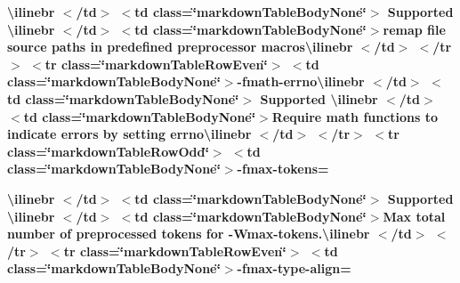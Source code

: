 \begin{longtabu}
{\bfseries{{\ttfamily \textbackslash{}ilinebr \texorpdfstring{$<$}{<}/td\texorpdfstring{$>$}{>} \texorpdfstring{$<$}{<}td class=\char`\"{}markdown\+Table\+Body\+None\char`\"{}\texorpdfstring{$>$}{>} Supported \textbackslash{}ilinebr \texorpdfstring{$<$}{<}/td\texorpdfstring{$>$}{>} \texorpdfstring{$<$}{<}td class=\char`\"{}markdown\+Table\+Body\+None\char`\"{}\texorpdfstring{$>$}{>}}remap file source paths in predefined preprocessor macros{\ttfamily \textbackslash{}ilinebr \texorpdfstring{$<$}{<}/td\texorpdfstring{$>$}{>} \texorpdfstring{$<$}{<}/tr\texorpdfstring{$>$}{>} \texorpdfstring{$<$}{<}tr class=\char`\"{}markdown\+Table\+Row\+Even\char`\"{}\texorpdfstring{$>$}{>} \texorpdfstring{$<$}{<}td class=\char`\"{}markdown\+Table\+Body\+None\char`\"{}\texorpdfstring{$>$}{>}}-\/fmath-\/errno{\ttfamily \textbackslash{}ilinebr \texorpdfstring{$<$}{<}/td\texorpdfstring{$>$}{>} \texorpdfstring{$<$}{<}td class=\char`\"{}markdown\+Table\+Body\+None\char`\"{}\texorpdfstring{$>$}{>} Supported \textbackslash{}ilinebr \texorpdfstring{$<$}{<}/td\texorpdfstring{$>$}{>} \texorpdfstring{$<$}{<}td class=\char`\"{}markdown\+Table\+Body\+None\char`\"{}\texorpdfstring{$>$}{>}}Require math functions to indicate errors by setting errno{\ttfamily \textbackslash{}ilinebr \texorpdfstring{$<$}{<}/td\texorpdfstring{$>$}{>} \texorpdfstring{$<$}{<}/tr\texorpdfstring{$>$}{>} \texorpdfstring{$<$}{<}tr class=\char`\"{}markdown\+Table\+Row\+Odd\char`\"{}\texorpdfstring{$>$}{>} \texorpdfstring{$<$}{<}td class=\char`\"{}markdown\+Table\+Body\+None\char`\"{}\texorpdfstring{$>$}{>}}-\/fmax-\/tokens=}}

{\bfseries{{\ttfamily \textbackslash{}ilinebr \texorpdfstring{$<$}{<}/td\texorpdfstring{$>$}{>} \texorpdfstring{$<$}{<}td class=\char`\"{}markdown\+Table\+Body\+None\char`\"{}\texorpdfstring{$>$}{>} Supported \textbackslash{}ilinebr \texorpdfstring{$<$}{<}/td\texorpdfstring{$>$}{>} \texorpdfstring{$<$}{<}td class=\char`\"{}markdown\+Table\+Body\+None\char`\"{}\texorpdfstring{$>$}{>}}Max total number of preprocessed tokens for -\/Wmax-\/tokens.{\ttfamily \textbackslash{}ilinebr \texorpdfstring{$<$}{<}/td\texorpdfstring{$>$}{>} \texorpdfstring{$<$}{<}/tr\texorpdfstring{$>$}{>} \texorpdfstring{$<$}{<}tr class=\char`\"{}markdown\+Table\+Row\+Even\char`\"{}\texorpdfstring{$>$}{>} \texorpdfstring{$<$}{<}td class=\char`\"{}markdown\+Table\+Body\+None\char`\"{}\texorpdfstring{$>$}{>}}-\/fmax-\/type-\/align=}}


\end{longtabu}
